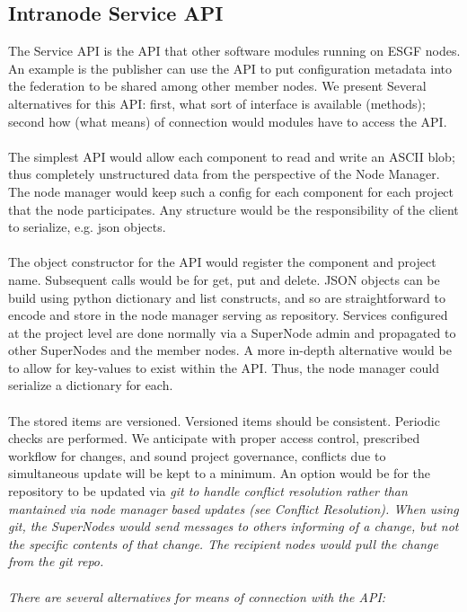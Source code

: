 \documentclass[oneside,12pt]{memoir}
\begin{document}
\subsection{Intranode Service API}

The Service API is the API that other software modules running on ESGF nodes.  An example is the publisher can use the API to put configuration metadata into the federation to be shared among other member nodes.  We present Several alternatives for this API: first, what sort of interface is available (methods); second how (what means) of connection would modules have to access the API.\\
\\
 The simplest API would allow each component to read and write an ASCII blob; thus completely unstructured data from the perspective of the Node Manager.  The node manager would keep such a config for each component for each project that the node participates.   Any structure would be the responsibility of the client to serialize, e.g. json objects.  \\
 \\
   The object constructor for the API would register the component and project name.  Subsequent calls would be for get, put and delete. 
    JSON objects can be build using python dictionary and list constructs, and so are straightforward to encode and store in the node manager serving as repository.   Services configured at the project level are done normally via a SuperNode admin and propagated to other SuperNodes and the member nodes.  A more in-depth alternative would be to allow for key-values to exist within the API.  Thus, the node manager could serialize a dictionary for each.\\
\\
The stored items are versioned.  Versioned items should be consistent.  Periodic checks are performed.  We anticipate with proper access control, prescribed workflow for changes, and sound project governance, conflicts due to simultaneous update will be kept to a minimum.  An option would be for the repository to be updated via \em{git} to handle conflict resolution rather than mantained via node manager based updates (see Conflict Resolution).
When using git, the SuperNodes would send messages to others informing of a change, but not the specific contents of that change.  The recipient nodes would pull the change from the git repo.  
\\
\\
There are several alternatives for means of connection with the API:
\end{document}
